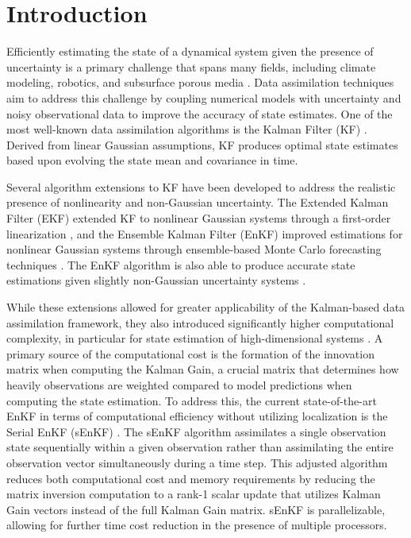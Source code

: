 \documentclass[11p]{elsarticle}
\numberwithin{equation}{section}
\begin{document}
\section{Introduction}
\label{sec:intro}

Efficiently estimating the state of a dynamical system given the presence of uncertainty is a primary challenge that spans many fields, including climate modeling, robotics, and subsurface porous media \cite{Bannister2020, Smith1987, Hu2025, Arbogast1990}.  Data assimilation techniques aim to address this challenge by coupling numerical models with uncertainty and noisy observational data to improve the accuracy of state estimates.  One of the most well-known data assimilation algorithms is the Kalman Filter (KF) \cite{Kalman1960}.  Derived from linear Gaussian assumptions, KF produces optimal state estimates based upon evolving the state mean and covariance in time.  


Several algorithm extensions to KF have been developed to address the realistic presence of nonlinearity and non-Gaussian uncertainty.  
The Extended Kalman Filter (EKF) extended KF to nonlinear Gaussian systems through a first-order linearization \cite{Schmidt1962}, and the Ensemble Kalman Filter (EnKF) improved estimations for nonlinear Gaussian systems through ensemble-based Monte Carlo forecasting techniques \cite{Evensen1994, Anderson2001, Houtekamer2005}. The EnKF algorithm is also able to produce accurate state estimations given slightly non-Gaussian uncertainty systems \cite{Anderson2010}.

While these extensions allowed for greater applicability of the Kalman-based data assimilation framework, they also introduced significantly higher computational complexity, in particular for state estimation of high-dimensional systems \cite{Tippett2003, Sakov2008}.  A primary source of the computational cost is the formation of the innovation matrix when computing the Kalman Gain, a crucial matrix that determines how heavily observations are weighted compared to model predictions when computing the state estimation.  To address this, the current state-of-the-art EnKF in terms of computational efficiency without utilizing localization is the Serial EnKF (sEnKF) \cite{Houtekamer2001}.  The sEnKF algorithm assimilates a single observation state sequentially within a given observation rather than assimilating the entire observation vector simultaneously during a time step.  This adjusted algorithm reduces both computational cost and memory requirements by reducing the matrix inversion computation to a rank-1 scalar update that utilizes Kalman Gain vectors instead of the full Kalman Gain matrix. sEnKF is parallelizable, allowing for further time cost reduction in the presence of multiple processors.
\end{document}
